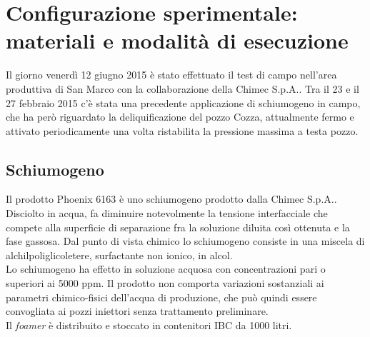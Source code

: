 
\section{Configurazione sperimentale: materiali e modalità di esecuzione}
Il giorno venerdì 12 giugno 2015 è stato effettuato il test di campo nell'area produttiva di San Marco con la collaborazione della Chimec S.p.A.. Tra il 23 e il 27 febbraio 2015 c'è stata una precedente applicazione di schiumogeno in campo, che ha però riguardato la deliquificazione del pozzo Cozza, attualmente fermo e attivato periodicamente una volta ristabilita la pressione massima a testa pozzo.\\

\subsection{Schiumogeno}
Il prodotto Phoenix 6163 è uno schiumogeno prodotto dalla Chimec S.p.A.. Disciolto in acqua, fa diminuire notevolmente la tensione interfacciale che compete alla superficie di separazione fra la soluzione diluita così ottenuta e la fase gassosa. Dal punto di vista chimico lo schiumogeno consiste in una miscela di alchilpoliglicoletere, surfactante non ionico, in alcol. \\
Lo schiumogeno ha effetto in soluzione acquosa con concentrazioni pari o superiori ai 5000 ppm. Il prodotto non comporta variazioni sostanziali ai parametri chimico-fisici dell'acqua di produzione, che può quindi essere convogliata ai pozzi iniettori senza trattamento preliminare.\\ 
Il \textit{foamer} è distribuito e stoccato in contenitori IBC da 1000 litri.
